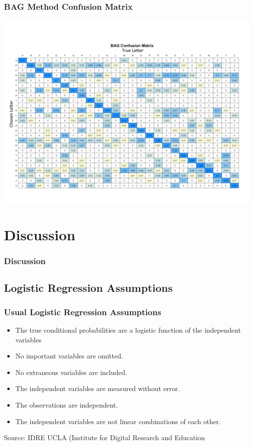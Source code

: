 \documentclass{beamer}
\begin{document}
\begin{frame}
\frametitle{BAG Method Confusion Matrix}
\begin{center} 
\includegraphics[width=.9 \textwidth]{bagConfuse}
\end{center}
\end{frame}


\section{Discussion}
\begin{frame}
\frametitle{Discussion}
\end{frame}

\subsection{Logistic Regression Assumptions}
\begin{frame}
\frametitle{Usual Logistic Regression Assumptions}
\begin{itemize}
\item The true conditional probabilities are a logistic function of the independent variables
\item No important variables are omitted.
\item No extraneous variables are included.
\item The independent variables are measured without error.
\item The observations are independent.
\item The independent variables are not linear combinations of each other.
\end{itemize}

\tiny{Source: IDRE UCLA (Institute for Digital Research and Education}
\end{frame}
\end{document}
